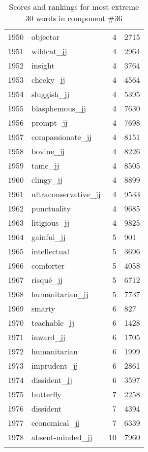 \begin{longtable}[!htbp]{| rlr@{.}l |}
    1950 & objector & 4 & 2715 \\
    1951 & wildcat\_jj & 4 & 2964 \\
    1952 & insight & 4 & 3764 \\
    1953 & cheeky\_jj & 4 & 4564 \\
    1954 & sluggish\_jj & 4 & 5395 \\
    1955 & blasphemous\_jj & 4 & 7630 \\
    1956 & prompt\_jj & 4 & 7698 \\
    1957 & compassionate\_jj & 4 & 8151 \\
    1958 & bovine\_jj & 4 & 8226 \\
    1959 & tame\_jj & 4 & 8505 \\
    1960 & clingy\_jj & 4 & 8899 \\
    1961 & ultraconservative\_jj & 4 & 9533 \\
    1962 & punctuality & 4 & 9685 \\
    1963 & litigious\_jj & 4 & 9825 \\
    1964 & gainful\_jj & 5 & 901 \\
    1965 & intellectual & 5 & 3696 \\
    1966 & comforter & 5 & 4058 \\
    1967 & risqué\_jj & 5 & 6712 \\
    1968 & humanitarian\_jj & 5 & 7737 \\
    1969 & smarty & 6 & 827 \\
    1970 & teachable\_jj & 6 & 1428 \\
    1971 & inward\_jj & 6 & 1705 \\
    1972 & humanitarian & 6 & 1999 \\
    1973 & imprudent\_jj & 6 & 2861 \\
    1974 & dissident\_jj & 6 & 3597 \\
    1975 & butterfly & 7 & 2258 \\
    1976 & dissident & 7 & 4394 \\
    1977 & economical\_jj & 7 & 6339 \\
    1978 & absent-minded\_jj & 10 & 7960 \\
    \hline
    \caption{Scores and rankings for most extreme 30 words in component \#36} \\
\end{longtable}

